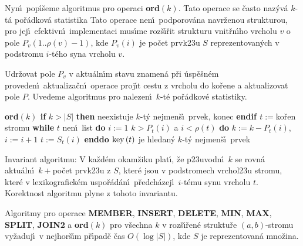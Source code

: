 \flushpar Nyn\'\i\ pop\'\i\v seme algoritmus pro operaci {\bf ord$
\left(k\right)$}. Tato 
operace se \v casto naz\'yv\'a $k$-t\'a po\v r\'adko\-v\'a statistika
Tato operace nen\'\i\ podporov\'ana navr\v zenou 
strukturou, pro jej\'\i\ efektivn\'\i\ implementaci mus\'\i me 
roz\v s\'\i\v rit strukturu vnit\v rn\'\i ho vrcholu $v$ o pole\newline 
$P_v\left(1..\rho \left(v\right)-1\right)$, kde $P_v\left(i\right)$ je po\v cet prvk\accent23u $S$ reprezentovan\'ych 
v podstromu $i$-t\'eho syna vrcholu $v$.
\smallskip
 
\flushpar Udr\v zovat pole $P_v$ v aktu\'aln\'\i m stavu znamen\'a p\v ri \'usp\v e\v sn\'em 
pro\-veden\'\i\ aktualiza\v cn\'\i\ operace proj\'\i t cestu z vrcholu do ko\v re\-ne 
a aktualizovat pole $P$. Uvedeme algoritmus pro 
naleze\-n\'\i\ $k$-t\'e po\v r\'adkov\'e statistiky.
\medskip

{\bf ord$\left(k\right)$\newline 
if} $k>|S|$ {\bf then} neexistuje $k$-t\'y nejmen\v s\'\i\ prvek, konec 
{\bf endif\newline 
$t:=$}ko\v ren stromu\newline 
{\bf while} $t$ nen\'\i\ list {\bf do}\newline 
\phantom{---}$i:=1$\newline 
\phantom{---}{\bf while} $k>P_t\left(i\right)$ a $i<\rho \left(t\right)$ {\bf do}\newline 
\phantom{------}$k:=k-P_t\left(i\right)$, $i:=i+1$\newline 
\phantom{---}{\bf enddo}\newline 
\phantom{---}$t:=S_t\left(i\right)$\newline 
{\bf enddo}\newline 
$\operatorname{key}\left(t\right)$ je hledan\'y $k$-t\'y nejmen\v s\'\i\ prvek
\bigskip

\flushpar Invariant algoritmu: V ka\v zd\'em okam\v ziku plat\'\i , 
\v ze p\accent23uvodn\'\i\ $k$ se rovn\'a aktu\'aln\'\i\ $k+$po\v cet prvk\accent23u z 
$S$, kter\'e jsou v podstromech vrchol\accent23u stromu, kter\'e v 
lexikografick\'em uspo\v r\'ad\'an\'\i\ p\v redch\'azej\'\i\ $i$-t\'emu synu 
vrcholu $t$. Korektnost algoritmu plyne z tohoto 
invariantu.


Algoritmy pro operace {\bf MEMBER}, {\bf INSERT}, 
{\bf DE\-LETE}, {\bf MIN}, {\bf MAX}, {\bf SPLIT}, {\bf JOIN2} a {\bf ord$
\left(k\right)$} pro v\v sechna $k$ v 
roz\v s\'\i\v ren\'e struktu\v re $\left(a,b\right)$-stromu vy\-\v za\-duj\'\i\ v 
nejhor\v s\'\i m p\v r\'\i\-pa\-d\v e \v cas $O\left(\log|S|\right)$, kde $S$ je reprezentovan\'a 
mno\v zina.  
\endproclaim



